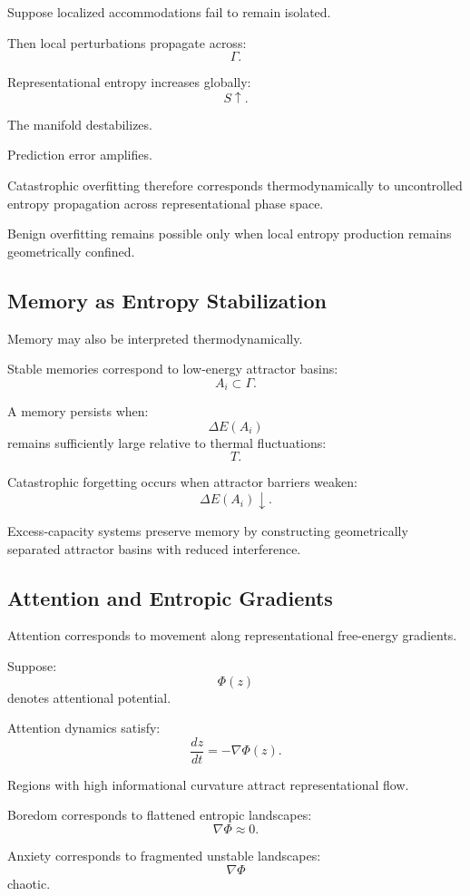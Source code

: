 \documentclass[12pt,a4paper]{article}
\begin{document}
Suppose localized accommodations fail to remain isolated.

Then local perturbations propagate across:
\[
\Gamma.
\]

Representational entropy increases globally:
\[
S
\uparrow.
\]

The manifold destabilizes.

Prediction error amplifies.

Catastrophic overfitting therefore corresponds thermodynamically to uncontrolled entropy propagation across representational phase space.

Benign overfitting remains possible only when local entropy production remains geometrically confined.

\subsection{Memory as Entropy Stabilization}

Memory may also be interpreted thermodynamically.

Stable memories correspond to low-energy attractor basins:
\[
A_i
\subset
\Gamma.
\]

A memory persists when:
\[
\Delta E(A_i)
\]
remains sufficiently large relative to thermal fluctuations:
\[
T.
\]

Catastrophic forgetting occurs when attractor barriers weaken:
\[
\Delta E(A_i)
\downarrow.
\]

Excess-capacity systems preserve memory by constructing geometrically separated attractor basins with reduced interference.

\subsection{Attention and Entropic Gradients}

Attention corresponds to movement along representational free-energy gradients.

Suppose:
\[
\Phi(z)
\]
denotes attentional potential.

Attention dynamics satisfy:
\[
\frac{dz}{dt}
=
-
\nabla \Phi(z).
\]

Regions with high informational curvature attract representational flow.

Boredom corresponds to flattened entropic landscapes:
\[
\nabla \Phi
\approx
0.
\]

Anxiety corresponds to fragmented unstable landscapes:
\[
\nabla \Phi
\]
chaotic.
\end{document}
